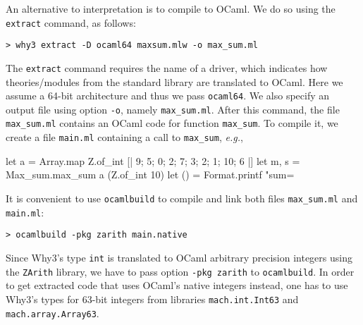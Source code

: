 An alternative to interpretation is to compile \whyml to OCaml.
We do so using the \texttt{extract} command, as follows:
\begin{verbatim}
> why3 extract -D ocaml64 maxsum.mlw -o max_sum.ml
\end{verbatim}
The \texttt{extract} command requires the name of a driver, which indicates
how theories/modules from the \why standard library are translated to
OCaml. Here we assume a 64-bit architecture and thus we pass
\texttt{ocaml64}. We also specify an output file using option
\verb+-o+, namely \texttt{max\_sum.ml}.
After this command, the file \texttt{max\_sum.ml} contains an OCaml
code for function \texttt{max\_sum}.
To compile it, we create a file \texttt{main.ml}
containing a call to \texttt{max\_sum}, \emph{e.g.},
\begin{whycode}
let a = Array.map Z.of_int [| 9; 5; 0; 2; 7; 3; 2; 1; 10; 6 |]
let m, s = Max_sum.max_sum a (Z.of_int 10)
let () = Format.printf "sum=%
\end{whycode}
It is convenient to use \texttt{ocamlbuild} to compile and link both
files \texttt{max\_sum.ml} and \texttt{main.ml}:
\begin{verbatim}
> ocamlbuild -pkg zarith main.native
\end{verbatim}
Since Why3's type
\texttt{int} is translated to OCaml arbitrary precision integers using
the \texttt{ZArith} library, we have to pass option \texttt{-pkg
  zarith} to \texttt{ocamlbuild}. In order to get extracted code that
uses OCaml's native integers instead, one has to use Why3's types for
63-bit integers from libraries \texttt{mach.int.Int63} and
\texttt{mach.array.Array63}.


